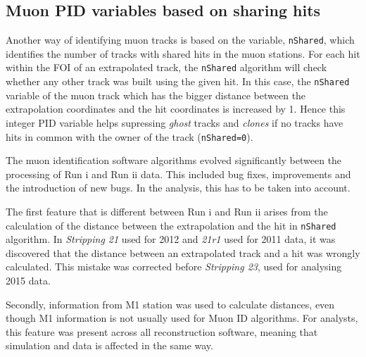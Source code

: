 \subsection{Muon PID variables based on sharing hits }
\label{bugs}

Another way of identifying muon tracks is based on the variable, \texttt{nShared}, which identifies the number of tracks with shared hits in the muon stations. For each hit within the \gls{FOI} of an extrapolated track, the \texttt{nShared} algorithm will check whether any other track was built using the given hit. In this case, the \texttt{nShared} variable of the muon track which has the bigger distance between the extrapolation coordinates and the hit coordinates is increased by 1. Hence this integer \gls{PID} variable helps supressing \textit{ghost} tracks and \textit{clones} if no tracks have hits in common with the owner of the track (\texttt{nShared=0}).

The muon identification software algorithms evolved significantly between the processing of Run \Rn{1} and Run \Rn{2} data. This included bug fixes, improvements and the introduction of new bugs. In the \Bmumumu analysis, this has to be taken into account.


The first feature that is different between Run \Rn{1} and Run \Rn{2} arises from the calculation of the distance between the extrapolation and the hit in \texttt{nShared} algorithm.
In \textit{Stripping 21} used for 2012 and \textit{21r1} used for 2011 data, it was discovered that the distance between an extrapolated track and a hit was wrongly calculated. This mistake was corrected before \textit{Stripping 23}, used for analysing 2015 data. 

Secondly, information from M1 station was used to calculate distances, even though M1 information is not usually used for Muon ID algorithms.  For analysts, this feature was present across all reconstruction software, meaning that simulation and data is affected in the same way.

